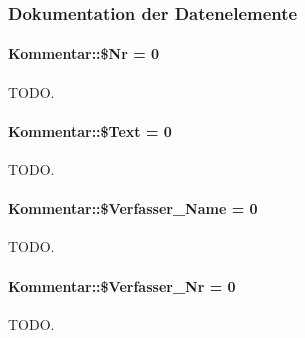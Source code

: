 \subsubsection{Dokumentation der Datenelemente}
\hypertarget{classKommentar_1b0a3cfcb9fc7075f985cc8067ab1982}{
\paragraph[\$Nr]{\setlength{\rightskip}{0pt plus 5cm}Kommentar::\$Nr = 0}\hfill}
\label{classKommentar_1b0a3cfcb9fc7075f985cc8067ab1982}


TODO. 

\hypertarget{classKommentar_c9a481413d6ba0c000719ad514bad4b5}{
\paragraph[\$Text]{\setlength{\rightskip}{0pt plus 5cm}Kommentar::\$Text = 0}\hfill}
\label{classKommentar_c9a481413d6ba0c000719ad514bad4b5}


TODO. 

\hypertarget{classKommentar_84f0fc10295968adde28169f8df018d9}{
\paragraph[\$Verfasser\_\-Name]{\setlength{\rightskip}{0pt plus 5cm}Kommentar::\$Verfasser\_\-Name = 0}\hfill}
\label{classKommentar_84f0fc10295968adde28169f8df018d9}


TODO. 

\hypertarget{classKommentar_c92b002e40690ee052fec446ff2a0ef6}{
\paragraph[\$Verfasser\_\-Nr]{\setlength{\rightskip}{0pt plus 5cm}Kommentar::\$Verfasser\_\-Nr = 0}\hfill}
\label{classKommentar_c92b002e40690ee052fec446ff2a0ef6}


TODO. 

